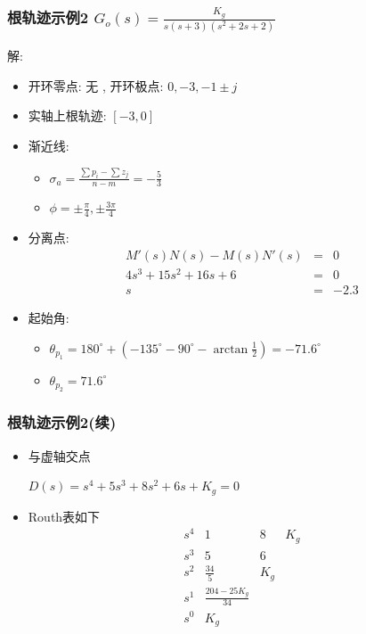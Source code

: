 \documentclass{article}
\begin{document}
\begin{frame}
\frametitle{根轨迹示例2 $G_o(s) = \frac{K_g}{s(s+3)(s^2+2s+2)}$}
\label{sec-2-2-5}


解:

\begin{itemize}
\item <2->开环零点: 无 , 开环极点: $0,-3,-1\pm j$
\item <3->实轴上根轨迹:  $[-3,0]$
\item <4->渐近线:
\begin{itemize}
\item $\sigma_a=\frac{\sum p_i-\sum z_j}{n-m}=-\frac{5}{3}$
\item $\phi=\pm\frac{\pi}{4},\pm\frac{3\pi}{4}$
\end{itemize}
\item <5->分离点: 
        \begin{eqnarray*}
        M'(s)N(s)-M(s)N'(s) &=& 0 \\
        4s^3+15s^2+16s+6 &= & 0 \\
        s &=& -2.3
        \end{eqnarray*}
\item <6->起始角:
\begin{itemize}
\item $\theta_{p_1}=180^{\circ}+(-135^{\circ}-90^{\circ}-\arctan\frac{1}{2})=-71.6^{\circ}$
\item $\theta_{p_2}=71.6^{\circ}$
\end{itemize}
\end{itemize}
\end{frame}
\begin{frame}
\frametitle{根轨迹示例2(续)}
\label{sec-2-2-6}

\begin{itemize}
\item 与虚轴交点		

       	$D(s)=s^4+5s^3+8s^2+6s+K_g =0$
\end{itemize}
\begin{itemize}

\item Routh表如下\\
\label{sec-2-2-6-1}%
\[\begin{matrix}
                  s^4 & 1 & 8 & K_g \\
                  s^3 & 5 & 6 \\
                  s^2 & \frac{34}{5} & K_g \\
                  s^1 & \frac{204-25K_g}{34} \\
                  s^0 & K_g
                 \end{matrix}\]

\end{itemize} %
\end{frame}
\end{document}
